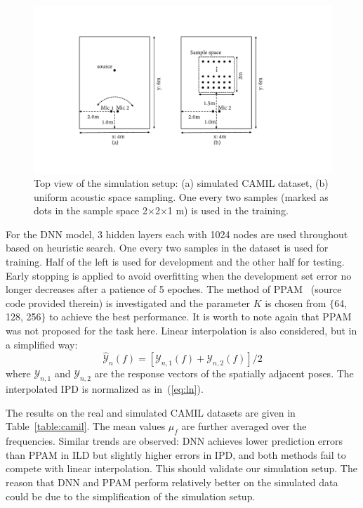 \documentclass[journal]{IEEEtran}
\begin{document}
\begin{figure}
\centering
\includegraphics[width=0.89\linewidth]{fig1_room.pdf}
\caption{Top view of the simulation setup: (a) simulated CAMIL dataset, (b) uniform acoustic space sampling. One every two samples (marked as dots in the sample space 2$\times$2$\times$1 m) is used in the training.}
\label{fig1:room}
\end{figure}

For the DNN model, 3 hidden layers each with 1024 nodes are used throughout based on heuristic search. One every two samples in the dataset is used for training. Half of the left is used for development and the other half for testing. Early stopping is applied to avoid overfitting when the development set error no longer decreases after a patience of 5 epoches. The method of PPAM~\cite{deleforge2015acoustic} (source code provided therein) is investigated and the parameter $K$ is chosen from $\{$64, 128, 256$\}$ to achieve the best performance. It is worth to note again that PPAM was not proposed for the task here. Linear interpolation is also considered, but in a simplified way:
\begin{equation}\label{eq:li}
  \widehat{\mathcal{Y}}_n(f)=[\mathcal{Y}_{n,1}(f)+\mathcal{Y}_{n,2}(f)]/2
\end{equation}
where $\mathcal{Y}_{n,1}$ and $\mathcal{Y}_{n,2}$ are the response vectors of the spatially adjacent poses. The interpolated IPD is normalized as in~(\ref{eq:ln}).

The results on the real and simulated CAMIL datasets are given in Table~\ref{table:camil}. The mean values $\mu_f$ are further averaged over the frequencies. Similar trends are observed: DNN achieves lower prediction errors than PPAM in ILD but slightly higher errors in IPD, and both methods fail to compete with linear interpolation. This should validate our simulation setup. The reason that DNN and PPAM perform relatively better on the simulated data could be due to the simplification of the simulation setup.
\end{document}
